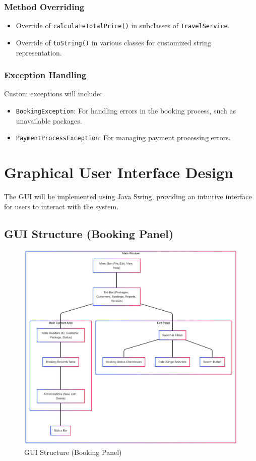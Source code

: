 \documentclass[12pt]{article}
\begin{document}
\subsubsection{Method Overriding}
\begin{itemize}
    \item Override of \texttt{calculateTotalPrice()} in subclasses of \texttt{TravelService}.
    \item Override of \texttt{toString()} in various classes for customized string representation.
\end{itemize}

\subsubsection{Exception Handling}
Custom exceptions will include:
\begin{itemize}
    \item \texttt{BookingException}: For handling errors in the booking process, such as unavailable packages.
    \item \texttt{PaymentProcessException}: For managing payment processing errors.
\end{itemize}

\section{Graphical User Interface Design}

The GUI will be implemented using Java Swing, providing an intuitive interface for users to interact with the system.

\subsection{GUI Structure (Booking Panel)}

\begin{figure}[H]
\centering
\includegraphics[width=\textwidth]{uml2.png}
\caption{GUI Structure (Booking Panel)}
\end{figure}
\newpage
\end{document}
